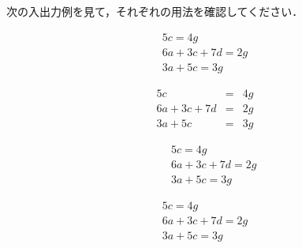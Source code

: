 \begin{Prob}
次の入出力例を見て，それぞれの用法を確認してください．

\begin{InOut}
\begin{eqnarray*}
 5c = 4g \\
 6a + 3c + 7d = 2g \\
 3a + 5c = 3g
\end{eqnarray*}
\end{InOut}
\begin{InOut}
\begin{eqnarray*}
 5c           &=& 4g \\
 6a + 3c + 7d &=& 2g \\
 3a + 5c      &=& 3g
\end{eqnarray*}
\end{InOut}

\begin{InOut}
\begin{eqnarray*}
&& 5c = 4g \\
&& 6a + 3c + 7d = 2g \\
&& 3a + 5c = 3g
\end{eqnarray*}
\end{InOut}


\begin{InOut}
\begin{eqnarray*}
& 5c = 4g &\\
& 6a + 3c + 7d = 2g &\\
& 3a + 5c = 3g&
\end{eqnarray*}
\end{InOut}



\end{Prob}
